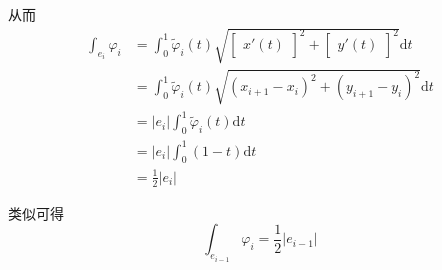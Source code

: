 从而 \\
\begin{equation*}
\begin{aligned}
\int_{e_i}\varphi_i & = \int_0^1 \tilde{\varphi}_i(t)\sqrt{\begin{bmatrix}x'(t)\end{bmatrix}^2 + \begin{bmatrix}y'(t)\end{bmatrix}^2} \mathrm dt\\ 
& = \int_0^1 \tilde{\varphi}_i(t)\sqrt{(x_{i+1} - x_i)^2 + (y_{i+1} - y_i)^2} \mathrm dt \\
& = |e_i|\int_0^1\tilde \varphi_i(t) \mathrm dt \\
& = |e_i|\int_0^1(1 - t) \mathrm dt \\
& = \frac{1}{2}|e_i|
\end{aligned}
\end{equation*}

类似可得 \\
\begin{equation*}
\int_{e_{i - 1}}\varphi_i = \frac{1}{2}|e_{i - 1}|
\end{equation*}

